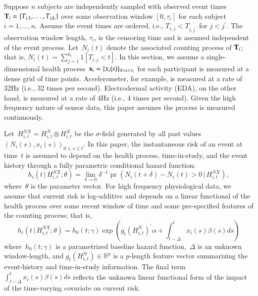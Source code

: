 \documentclass[12pt]{amsart}
\def\pr{\mathop{\text{pr}}\nolimits}
\def\pr{\mathop{\text{pr}}\nolimits}
\def\given{\, | \,}
\def\Given{\, \big | \,}
\def\bfx{{\bf x}}
\def\bfT{{\bf T}}
\begin{document}
Suppose $n$ subjects are independently sampled with observed event times~$\bfT_{i} = \{ T_{i,1}, \ldots, T_{i,k_i}\}$ over some observation window $[0, \tau_i]$ for each subject $i = 1,\ldots, n$.  Assume the event times are ordered, i.e., $T_{i,j} < T_{i,j^\prime}$ for $j < j^\prime$. The observation window length, $\tau_i$, is the censoring time and is assumed independent of the event process. Let~$N_{i} (t)$ denote the associated counting process of $\bfT_{i}$; that is, $N_i (t) = \sum_{j=1}^{k_i} 1 [ T_{i,j} < t ]$. In this section, we assume a single-dimensional health process~$\bfx_i = \{ x_i (s) \}_{0 < s < \tau_i}$ for each participant is measured at a dense grid of time points.  Accelerometer, for example, is measured at a rate of 32Hz (i.e., $32$ times per second). Electrodermal activity (EDA), on the other hand, is measured at a rate of 4Hz (i.e., 4 times per second).  Given the high frequency nature of sensor data, this paper assumes the process is measured continuously.

Let~$H_{i,t}^{NX} = H_{i,t}^{N} \otimes H_{i,t}^{X}$ be the $\sigma$-field generated by all past values~$(N_i (s), x_i (s))_{0 \leq s \leq t}$. In this paper, the instantaneous risk of an event at time~$t$ is assumed to depend on the health process, time-in-study, and the event history through a fully parametric conditional hazard function:
\begin{equation}
\label{eq:hazard}
h_i \left( t \Given H_{i,t}^{NX} ; \theta \right) =
\lim_{\delta \to 0} \delta^{-1} \pr \left( N_i(t+\delta) - N_i(t) > 0
  \given H_{i,t}^{NX} \right),
\end{equation}
where~$\theta$ is the parameter vector. For high frequency physiological data, we assume that current risk is log-additive and depends on a linear functional of the health process over some recent window of time and some pre-specified features of the counting process; that is,
\begin{equation}
\label{eq:hazardlinear}
h_i \left( t \given  H_{i,t}^{NX} ; \theta \right) =
h_0 (t; \gamma) \exp \left( g_t \left( H_{i,t}^{N} \right)^{\prime} \alpha
  + \int_{t-\Delta}^t x_i (s) \beta(s) ds  \right)
\end{equation}
where~$h_0(t;\gamma)$ is a parametrized baseline hazard function,~$\Delta$ is an unknown window-length, and $g_t( H_{i,t}^N ) \in \mathbb{R}^p$ is a $p$-length feature vector summarizing the event-history and time-in-study information. The final term~$\int_{t-\Delta}^t x_i(s) \beta(s) ds$ reflects the unknown linear functional form of the impact of the time-varying covariate on current risk.
\end{document}
